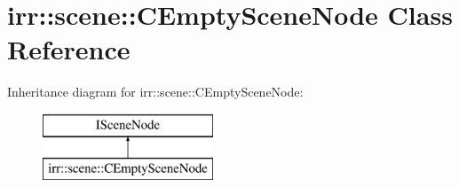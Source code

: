 \hypertarget{classirr_1_1scene_1_1_c_empty_scene_node}{\section{irr\-:\-:scene\-:\-:C\-Empty\-Scene\-Node Class Reference}
\label{classirr_1_1scene_1_1_c_empty_scene_node}
}
Inheritance diagram for irr\-:\-:scene\-:\-:C\-Empty\-Scene\-Node\-:\begin{figure}[H]
\begin{center}
\leavevmode
\includegraphics[height=2.000000cm]{classirr_1_1scene_1_1_c_empty_scene_node}
\end{center}
\end{figure}
